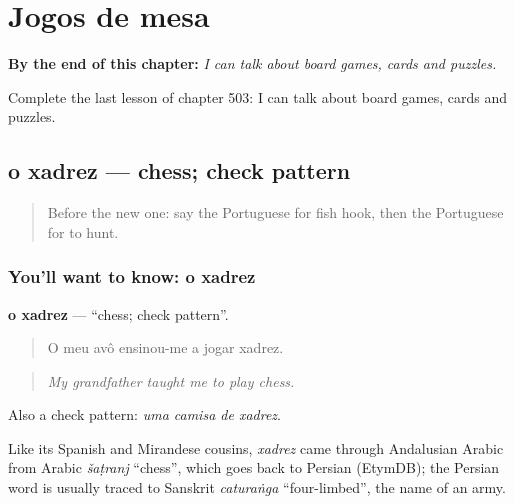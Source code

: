 
\chapter{Jogos de mesa}
\label{ch:pt-jogos-de-mesa}

\begin{chapteropening}
\textbf{By the end of this chapter:} \emph{I can talk about board games, cards and puzzles.}

Complete the last lesson of chapter 503: I can talk about board games, cards and puzzles.
\end{chapteropening}

\section[o xadrez]{o xadrez — chess; check pattern}

\label{lesson:PT-C503-xadrez}



\begin{quote}
Before the new one: say the Portuguese for fish hook, then the Portuguese for to hunt.
\end{quote}

\subsection*{You'll want to know: o xadrez}
\textbf{o xadrez} — \textquotedblleft{}chess; check pattern\textquotedblright{}.

\begin{quote}
O meu avô ensinou-me a jogar xadrez.
\end{quote}

\begin{quote}
\emph{My grandfather taught me to play chess.}
\end{quote}

Also a check pattern: \emph{uma camisa de xadrez}.

\begin{cousinweb}
Like its Spanish and Mirandese cousins, \emph{xadrez} came through Andalusian Arabic from Arabic \emph{šaṭranj} \textquotedblleft{}chess\textquotedblright{}, which goes back to Persian (EtymDB); the Persian word is usually traced to Sanskrit \emph{caturaṅga} \textquotedblleft{}four-limbed\textquotedblright{}, the name of an army.
\end{cousinweb}


